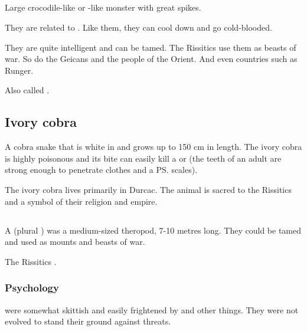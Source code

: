 \subsection{\Mezolisk}
\index{\mezolisk}
Large crocodile-like or \dragon-like monster with great spikes. 

They are related to \ophidians. 
Like them, they can cool down and go cold-blooded. 

They are quite intelligent and can be tamed. 
The Rissitics use them as beasts of war. 
So do the Geicans and the people of the Orient. 
And even countries such as Runger. 

Also called . 















\subsection{Ivory cobra}
A cobra snake that is white in \colour and grows up to 150 cm in length. The ivory cobra is highly poisonous and its bite can easily kill a \human{} or \scatha{} (the teeth of an adult are strong enough to penetrate clothes and a \ps{\scatha} scales). 

The ivory cobra lives primarily in Durcac. The animal is sacred to the Rissitics and a symbol of their religion and empire. 















\subsection{\Lotha}
\index{\lotha}
A \lotha (plural \emph{\lothae{}}) was a medium-sized theropod, 7-10 metres long.
They could be tamed and used as mounts and beasts of war. 

The Rissitics .





\subsubsection{Psychology}
\Lothae were somewhat skittish and easily frightened by  and other things. 
They were not evolved to stand their ground against threats.















